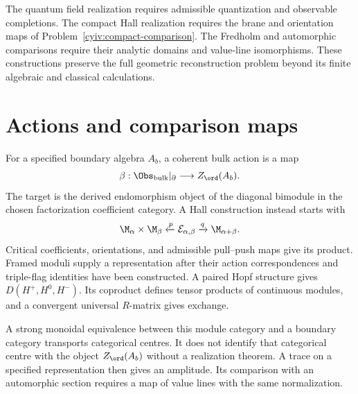 The quantum field realization requires admissible quantization and
observable completions.
The compact Hall realization requires the brane and orientation maps
of Problem~\ref{cyiv:compact-comparison}.
The Fredholm and automorphic comparisons require their analytic domains
and value-line isomorphisms.
These constructions preserve the full geometric reconstruction problem
beyond its finite algebraic and classical calculations.

\chapter{Actions and comparison maps}
For a specified boundary algebra $A_b$, a coherent bulk action is a map
\[
 \beta:\Obs_{\mathrm{bulk}}|_\partial\longrightarrow Z_{\ord}(A_b).
\]
The target is the derived endomorphism object of the diagonal bimodule
in the chosen factorization coefficient category.
A Hall construction instead starts with
\[
 \M_\alpha\times\M_\beta\xleftarrow{p}\mathcal E_{\alpha,\beta}
 \xrightarrow{q}\M_{\alpha+\beta}.
\]
Critical coefficients, orientations, and admissible pull--push maps
give its product.
Framed moduli supply a representation after their action
correspondences and triple-flag identities have been constructed.
A paired Hopf structure gives $D(H^+,H^0,H^-)$.
Its coproduct defines tensor products of continuous modules, and a
convergent universal $R$-matrix gives exchange.

A strong monoidal equivalence between this module category and a
boundary category transports categorical centres.
It does not identify that categorical centre with the object
$Z_{\ord}(A_b)$ without a realization theorem.
A trace on a specified representation then gives an amplitude.
Its comparison with an automorphic section requires a map of value
lines with the same normalization.

